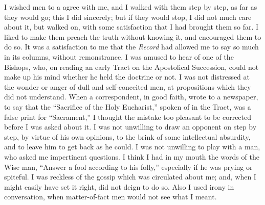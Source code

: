 I wished men to a agree with me, and I walked with them step by step,
as far as they would go; this I did sincerely; but if they would stop, I
did not much care about it, but walked on, with some satisfaction that I
had brought them so far. I liked to make them preach the truth without
knowing it, and encouraged them to do so. It was a satisfaction to me
that the \emph{Record} had allowed me to say so much in its columns, without
remonstrance. I was amused to hear of one of the Bishops, who, on
reading an early Tract on the Apostolical Succession, could not make up
his mind whether he held the doctrine or not. I was not distressed at
the wonder or anger of dull and self-conceited men, at propositions
which they did not understand. When a correspondent, in good faith,
wrote to a newspaper, to say that the ``Sacrifice of the Holy
Eucharist,'' spoken of in the Tract, was a false print for ``Sacrament,'' I thought the mistake too pleasant to be corrected
before I was asked about it. I was not unwilling to draw an opponent on
step by step, by virtue of his own opinions, to the brink of
some intellectual absurdity, and to leave him to get back as he could. I
was not unwilling to play with a man, who asked me impertinent
questions. I think I had in my mouth the words of the Wise man,
``Answer a fool according to his folly,'' especially if he was
prying or spiteful. I was reckless of the gossip which was circulated
about me; and, when I might easily have set it right, did not deign to
do so. Also I used irony in conversation, when matter-of-fact men would
not see what I meant.


